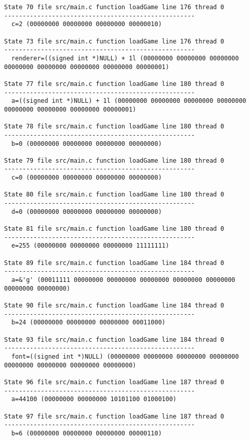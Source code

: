 \begin{verbatim}
State 70 file src/main.c function loadGame line 176 thread 0
----------------------------------------------------
  c=2 (00000000 00000000 00000000 00000010)

State 73 file src/main.c function loadGame line 176 thread 0
----------------------------------------------------
  renderer=((signed int *)NULL) + 1l (00000000 00000000 00000000 00000000 00000000 00000000 00000000 00000001)

State 77 file src/main.c function loadGame line 180 thread 0
----------------------------------------------------
  a=((signed int *)NULL) + 1l (00000000 00000000 00000000 00000000 00000000 00000000 00000000 00000001)

State 78 file src/main.c function loadGame line 180 thread 0
----------------------------------------------------
  b=0 (00000000 00000000 00000000 00000000)

State 79 file src/main.c function loadGame line 180 thread 0
----------------------------------------------------
  c=0 (00000000 00000000 00000000 00000000)

State 80 file src/main.c function loadGame line 180 thread 0
----------------------------------------------------
  d=0 (00000000 00000000 00000000 00000000)

State 81 file src/main.c function loadGame line 180 thread 0
----------------------------------------------------
  e=255 (00000000 00000000 00000000 11111111)

State 89 file src/main.c function loadGame line 184 thread 0
----------------------------------------------------
  a=&'g' (00011111 00000000 00000000 00000000 00000000 00000000 00000000 00000000)

State 90 file src/main.c function loadGame line 184 thread 0
----------------------------------------------------
  b=24 (00000000 00000000 00000000 00011000)

State 93 file src/main.c function loadGame line 184 thread 0
----------------------------------------------------
  font=((signed int *)NULL) (00000000 00000000 00000000 00000000 00000000 00000000 00000000 00000000)

State 96 file src/main.c function loadGame line 187 thread 0
----------------------------------------------------
  a=44100 (00000000 00000000 10101100 01000100)

State 97 file src/main.c function loadGame line 187 thread 0
----------------------------------------------------
  b=6 (00000000 00000000 00000000 00000110)


\end{verbatim}
